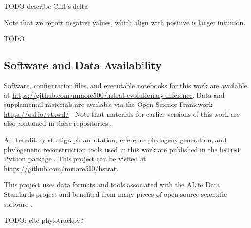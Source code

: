 TODO describe Cliff's delta
\citep{meissel2024using,cliff1993dominance}

Note that we report negative values, which align with positive is larger intuition.

TODO \citep{mann1947on}

\subsection{Software and Data Availability}

Software, configuration files, and executable notebooks for this work are available at \url{https://github.com/mmore500/hstrat-evolutionary-inference}.
Data and supplemental materials are available via the Open Science Framework \url{https://osf.io/vtxwd/} \citep{foster2017open}.
Note that materials for earlier versions of this work are also contained in these repositories \citep{moreno2023toward}.

All hereditary stratigraph annotation, reference phylogeny generation, and phylogenetic reconstruction tools used in this work are published in the \texttt{hstrat} Python package \citep{moreno2022hstrat}.
This project can be visited at \url{https://github.com/mmore500/hstrat}.

This project uses data formats and tools associated with the ALife Data Standards project \citep{lalejini2019data} and benefited from many pieces of open-source scientific software \citep{ofria2020empirical,sand2014tqdist,2020SciPy-NMeth,harris2020array,reback2020pandas,mckinney-proc-scipy-2010,sukumaran2010dendropy,cock2009biopython,torchiano2016effsize,waskom2021seaborn,hunter2007matplotlib,moreno2024apc,moreno2024qspool,moreno2023teeplot,hagen2021gen3sis,ofria2004avida,torchiano2016effsize}.

TODO: cite phylotrackpy?
